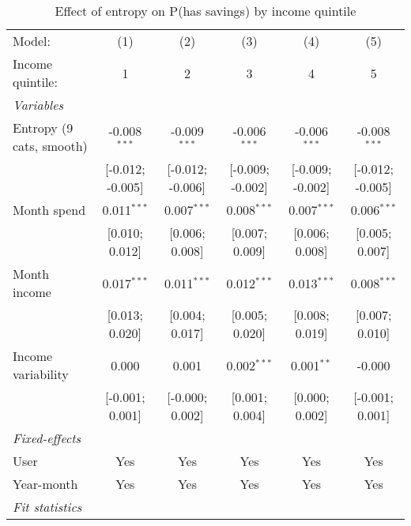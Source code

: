 
\begin{table}[htbp]
   \centering
   \tiny
   \begin{threeparttable}[b]
      \caption{\label{tab:reg_has_inflows_entropy_tag_sz_inc_quint} Effect of entropy on P(has savings) by income quintile}
      \begin{tabular}{lccccc}
         \tabularnewline \midrule \midrule
         Model:                   & (1)              & (2)              & (3)              & (4)              & (5)\\  
         Income quintile:         & 1                & 2                & 3                & 4                & 5 \\   
         \midrule
         \emph{Variables}\\
         Entropy (9 cats, smooth) & -0.008$^{***}$   & -0.009$^{***}$   & -0.006$^{***}$   & -0.006$^{***}$   & -0.008$^{***}$\\   
                                  & [-0.012; -0.005] & [-0.012; -0.006] & [-0.009; -0.002] & [-0.009; -0.002] & [-0.012; -0.005]\\   
         Month spend              & 0.011$^{***}$    & 0.007$^{***}$    & 0.008$^{***}$    & 0.007$^{***}$    & 0.006$^{***}$\\   
                                  & [0.010; 0.012]   & [0.006; 0.008]   & [0.007; 0.009]   & [0.006; 0.008]   & [0.005; 0.007]\\   
         Month income             & 0.017$^{***}$    & 0.011$^{***}$    & 0.012$^{***}$    & 0.013$^{***}$    & 0.008$^{***}$\\   
                                  & [0.013; 0.020]   & [0.004; 0.017]   & [0.005; 0.020]   & [0.008; 0.019]   & [0.007; 0.010]\\   
         Income variability       & 0.000            & 0.001            & 0.002$^{***}$    & 0.001$^{**}$     & -0.000\\   
                                  & [-0.001; 0.001]  & [-0.000; 0.002]  & [0.001; 0.004]   & [0.000; 0.002]   & [-0.001; 0.001]\\   
         \midrule
         \emph{Fixed-effects}\\
         User                     & Yes              & Yes              & Yes              & Yes              & Yes\\  
         Year-month               & Yes              & Yes              & Yes              & Yes              & Yes\\  
         \midrule
         \emph{Fit statistics}\\

\end{tabular}
\end{threeparttable}
\end{table}

